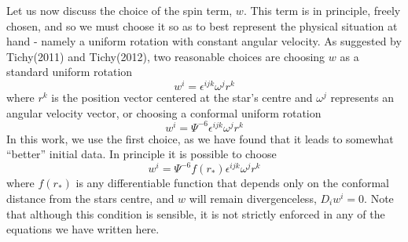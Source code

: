 \documentclass[aps,prd,amsmath,floatfix
,twocolumn
,superscriptaddress,nofootinbib,showpacs]{revtex4-1}
\theoremstyle{plain} \newtheorem{thm}{Theorem} \newtheorem{lem}{Lemma}
\begin{document}
Let us now discuss the choice of the spin term, $w$. This term is in
principle, freely chosen, and so we must choose it so as to best
represent the physical situation at hand - namely a uniform rotation
with constant angular velocity. As suggested by Tichy(2011)\cite{Tichy:2011gw} and
Tichy(2012)\cite{Tichy:2012rp}, two reasonable choices are choosing $w$ as a standard
uniform rotation
\begin{equation}
\label{eq:UniformRotation}
w^i = \epsilon^{ijk}\omega^{j}r^k
\end{equation}
where $r^k$ is the position vector centered at the star's centre and
$\omega^j$ represents an angular velocity vector, or choosing a
conformal uniform rotation
\begin{equation}
\label{eq:ConformalUniformRotation}
w^i = \Psi^{-6}\epsilon^{ijk}\omega^jr^k
\end{equation}
In this work, we use the first choice, as we have found that it leads
to somewhat ``better'' initial data. In principle it is possible to
choose
\begin{equation}
w^i = \Psi^{-6}f(r_{*})\epsilon^{ijk}\omega^jr^k
\end{equation}
where $f(r_{*})$ is any differentiable function that depends only on
the conformal distance from the stars centre, and $w$ will remain
divergenceless, $D_iw^i=0$. Note that although this condition is
sensible, it is not strictly enforced in any of the equations we have
written here.
\end{document}
